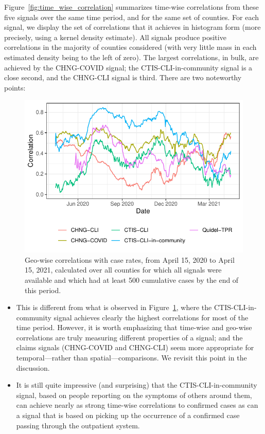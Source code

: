 \documentclass[9pt,twocolumn,twoside,lineno]{pnas-new}
\begin{document}
Figure~\ref{fig:time_wise_correlation} summarizes time-wise correlations from
these five signals over the same time period, and for the same set of counties.
For each signal, we display the set of correlations that it achieves in
histogram form (more precisely, using a kernel density estimate). All signals
produce positive correlations in the majority of counties considered (with very
little mass in each estimated density being to the left of zero). The largest
correlations, in bulk, are achieved by the CHNG-COVID signal; the
CTIS-CLI-in-community signal is a close second, and the CHNG-CLI signal is
third. There are two noteworthy points:

\begin{figure}[t]
  \includegraphics[width=\columnwidth]{fig/geo_wise_corr.pdf}
  \caption{Geo-wise correlations with case rates, from April 15, 2020 to April 
    15, 2021, calculated over all counties for which all signals were available
    and which had at least 500 cumulative cases by the end of this period.}
  \label{fig:geo_wise_correlation} 
\end{figure}

\begin{itemize}
\item This is different from what is observed in
  Figure~\ref{fig:geo_wise_correlation}, where the CTIS-CLI-in-community signal
  achieves clearly the highest correlations for most of the time period. 
  However, it is worth emphasizing that time-wise and geo-wise 
  correlations are truly measuring different properties of a signal; and the
  claims signals (CHNG-COVID and CHNG-CLI) seem more appropriate for
  temporal---rather than spatial---comparisons.  We revisit this point in the
  discussion.

\item It is still quite impressive (and surprising) that the
  CTIS-CLI-in-community signal, based on people reporting on the symptoms of
  others around them, can achieve  nearly as strong time-wise correlations to
  confirmed cases as can a signal that is based on picking up the occurrence of
  a confirmed case passing through the outpatient system.
\end{itemize}
\end{document}
